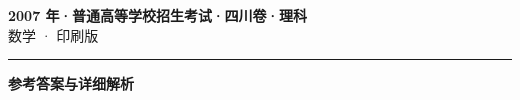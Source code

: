 \documentclass[zihao=5, a4paper]{ctexart}
\begin{document}
\begin{center}
  {\Large\bfseries 2007 年·普通高等学校招生考试·四川卷·理科}\\[4pt]
  {\large 数学 · 印刷版}
\end{center}
\medskip
{}

\par\bigskip\hrule\bigskip
{}
\begin{center}{\large\bfseries 参考答案与详细解析}\end{center}
\smallskip

\end{document}
